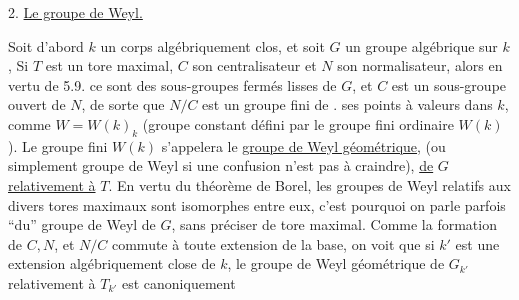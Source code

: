 2. \uline{Le groupe de Weyl.}

Soit d'abord $k$ un corps algébriquement clos, et soit $G$ un groupe algébrique sur $k$,  Si $T$ est un tore maximal, $C$ son centralisateur et $N$ son normalisateur, alors en vertu de  5.9. ce sont des sous-groupes fermés lisses de $G$,  et $C$ est un sous-groupe ouvert de $N$, de sorte que  $N/C$ est un groupe fini  de . ses points à valeurs dans $k$, comme $W=W(k)_k$ (groupe constant défini par le groupe fini ordinaire $W(k)$). Le groupe fini $W(k)$ s'appelera le \uline{groupe de Weyl géométrique}, (ou simplement groupe de Weyl si une confusion n'est pas à craindre), \uline{de} $G$ \uline{relativement à} $T$. En vertu du théorème de  Borel, les groupes de Weyl relatifs aux divers tores maximaux sont isomorphes entre eux, c'est pourquoi on parle parfois ``du'' groupe de Weyl de $G$, sans préciser de tore maximal.  Comme la formation de $C,N$, et $N/C$ commute à toute extension de la base, on voit que si $k'$ est une extension algébriquement close de $k$, le groupe de Weyl géométrique de $G_{k'}$ relativement à $T_{k'}$ est canoniquement 

